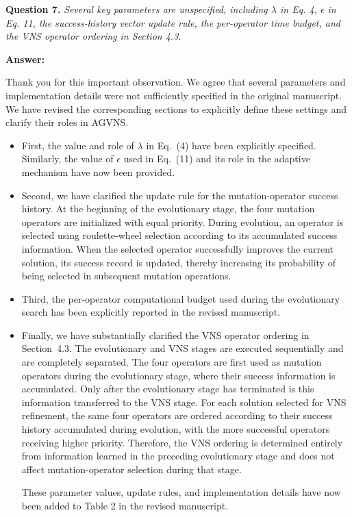 \documentclass[11pt]{article}
\newcommand{\question}[2]{\vspace{0.5em}\noindent\textbf{Question #1.} \emph{#2}\par}
\newcommand{\answer}{\noindent\textbf{Answer:}\par}
\begin{document}
\question{7}{Several key parameters are unspecified, including $\lambda$ in Eq. 4, $\epsilon$ in Eq. 11, the success-history vector update rule, the per-operator time budget, and the VNS operator ordering in Section 4.3.}

\answer

Thank you for this important observation. We agree that several parameters and implementation details were not sufficiently specified in the original manuscript. We have revised the corresponding sections to explicitly define these settings and clarify their roles in AGVNS.

\begin{itemize}
    \item First, the value and role of $\lambda$ in Eq.~(4) have been explicitly specified. Similarly, the value of $\epsilon$ used in Eq.~(11) and its role in the adaptive mechanism have now been provided.
    \item Second, we have clarified the update rule for the mutation-operator success history. At the beginning of the evolutionary stage, the four mutation operators are initialized with equal priority. During evolution, an operator is selected using roulette-wheel selection according to its accumulated success information. When the selected operator successfully improves the current solution, its success record is updated, thereby increasing its probability of being selected in subsequent mutation operations.
    \item Third, the per-operator computational budget used during the evolutionary search has been explicitly reported in the revised manuscript.
    \item Finally, we have substantially clarified the VNS operator ordering in Section~4.3. The evolutionary and VNS stages are executed sequentially and are completely separated. The four operators are first used as mutation operators during the evolutionary stage, where their success information is accumulated. Only after the evolutionary stage has terminated is this information transferred to the VNS stage. For each solution selected for VNS refinement, the same four operators are ordered according to their success history accumulated during evolution, with the more successful operators receiving higher priority. Therefore, the VNS ordering is determined entirely from information learned in the preceding evolutionary stage and does not affect mutation-operator selection during that stage.

These parameter values, update rules, and implementation details have now been added to Table 2 in the revised manuscript. 
\end{itemize}
\end{document}
